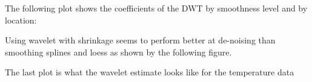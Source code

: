 \begin{figure}[htb]
\begin{center}
\end{center}
\end{figure}


The following plot shows the coefficients of the DWT by smoothness
level and by location:



\begin{figure}[htb]
\begin{center}
\end{center}
\end{figure}


Using wavelet with shrinkage seems to perform better at de-noising
than smoothing splines and loess as shown by the following figure.


\begin{figure}[htb]
\begin{center}
\end{center}
\end{figure}







\begin{figure}[htb]
\begin{center}
\end{center}
\end{figure}

The last plot is what the wavelet estimate looks like for the temperature data